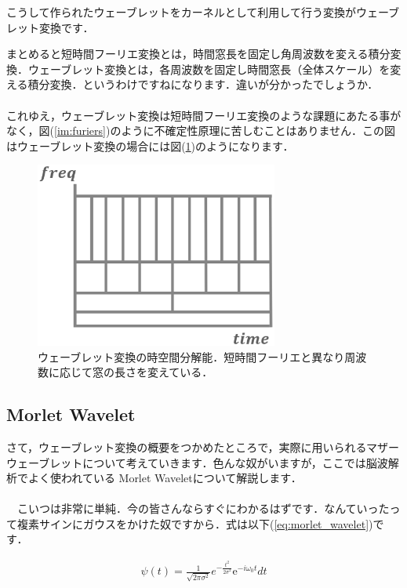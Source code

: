 \documentclass[11pt,a4paper]{ujreport} 	%
\begin{document}
こうして作られたウェーブレットをカーネルとして利用して行う変換がウェーブレット変換です．

まとめると短時間フーリエ変換とは，時間窓長を固定し角周波数を変える積分変換．ウェーブレット変換とは，各周波数を固定し時間窓長（全体スケール）を変える積分変換．というわけですねになります．違いが分かったでしょうか．\\
\\
これゆえ，ウェーブレット変換は短時間フーリエ変換のような課題にあたる事がなく，図(\ref{im:furiers})のように不確定性原理に苦しむことはありません．この図はウェーブレット変換の場合には図(\ref{im:wavelet-uncertainty})のようになります．

\begin{figure}[H]
  \label{im:wavelet-uncertainty}
  \centering
  \includegraphics[width=8cm]{../figures/wavelet-uncertainty.eps}
  \caption{ウェーブレット変換の時空間分解能．短時間フーリエと異なり周波数に応じて窓の長さを変えている．}
\end{figure}

\subsection{Morlet Wavelet}
さて，ウェーブレット変換の概要をつかめたところで，実際に用いられるマザーウェーブレットについて考えていきます．色んな奴がいますが，ここでは脳波解析でよく使われている Morlet Waveletについて解説します．\\
\\
　こいつは非常に単純．今の皆さんならすぐにわかるはずです．なんていったって複素サインにガウスをかけた奴ですから．式は以下(\ref{eq:morlet_wavelet})です．

\begin{eqnarray}
\psi(t) = \frac{1}{\sqrt{2\pi\sigma^2}}e^{-\frac{t^2}{2\sigma^2}}\mathrm{e}^{-i\omega_0 t} dt
\label{eq:morlet_wavelet}
\end{eqnarray}
\end{document}
